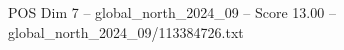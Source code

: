 \begin{textsample}{POS Dim 7 – global\_north\_2024\_09 – Score 13.00 – global\_north\_2024\_09/113384726.txt}
\end{textsample}
